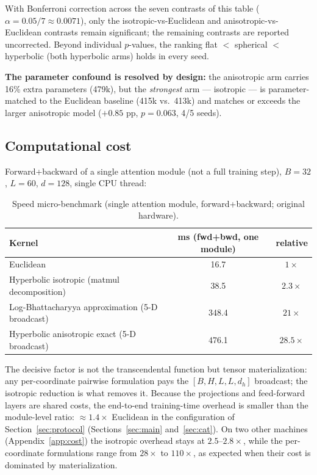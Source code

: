 \documentclass[11pt]{article}
\begin{document}
With Bonferroni correction across the seven contrasts of this table ($\alpha = 0.05/7 \approx 0.0071$), only the isotropic-vs-Euclidean and anisotropic-vs-Euclidean contrasts remain significant; the remaining contrasts are reported uncorrected. Beyond individual $p$-values, the ranking flat $<$ spherical $<$ hyperbolic (both hyperbolic arms) holds in every seed.

\textbf{The parameter confound is resolved by design:} the anisotropic arm carries 16\% extra parameters (479k), but the \emph{strongest} arm --- isotropic --- is parameter-matched to the Euclidean baseline (415k vs.\ 413k) and matches or exceeds the larger anisotropic model ($+0.85$ pp, $p = 0.063$, 4/5 seeds).

\subsection{Computational cost}\label{sec:cost}

Forward+backward of a single attention module (not a full training step), $B{=}32$, $L{=}60$, $d{=}128$, single CPU thread:

\begin{table}[h]
\centering\small
\begin{tabular}{lcc}
\toprule
Kernel & ms (fwd+bwd, one module) & relative \\
\midrule
Euclidean & 16.7 & $1\times$ \\
Hyperbolic isotropic (matmul decomposition) & 38.5 & $2.3\times$ \\
Log-Bhattacharyya approximation (5-D broadcast) & 348.4 & $21\times$ \\
Hyperbolic anisotropic exact (5-D broadcast) & 476.1 & $28.5\times$ \\
\bottomrule
\end{tabular}
\caption{Speed micro-benchmark (single attention module, forward+backward; original hardware).}
\label{tab:speed}
\end{table}

The decisive factor is not the transcendental function but tensor materialization: any per-coordinate pairwise formulation pays the $[B, H, L, L, d_h]$ broadcast; the isotropic reduction is what removes it. Because the projections and feed-forward layers are shared costs, the end-to-end training-time overhead is smaller than the module-level ratio: $\approx 1.4\times$ Euclidean in the configuration of Section~\ref{sec:protocol} (Sections~\ref{sec:main} and~\ref{sec:cat}). On two other machines (Appendix~\ref{app:cost}) the isotropic overhead stays at $2.5$--$2.8\times$, while the per-coordinate formulations range from $28\times$ to $110\times$, as expected when their cost is dominated by materialization.
\end{document}
